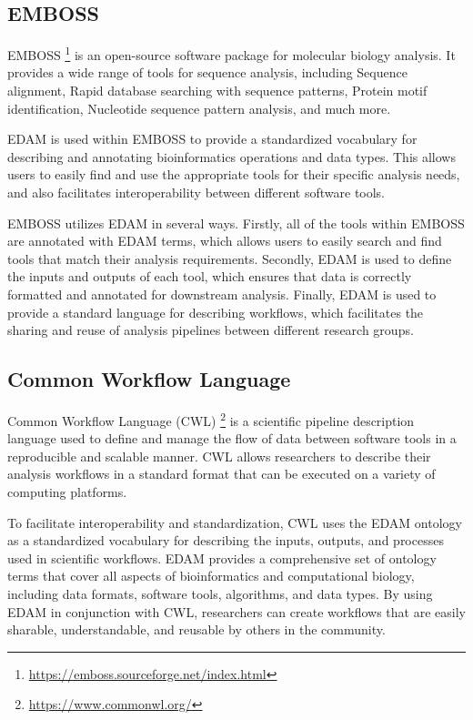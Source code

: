 \documentclass{scrartcl}
\begin{document}
\subsection{EMBOSS}
EMBOSS \footnote{\url{https://emboss.sourceforge.net/index.html}} is an open-source software package 
  for molecular biology analysis. It provides a wide range of tools for sequence analysis, 
  including Sequence alignment, Rapid database searching with sequence patterns, 
  Protein motif identification, Nucleotide sequence pattern analysis, and much more.

EDAM is used within EMBOSS to provide a standardized vocabulary for describing and annotating 
  bioinformatics operations and data types. 
  This allows users to easily find and use the appropriate tools for their specific analysis needs, 
  and also facilitates interoperability between different software tools.

EMBOSS utilizes EDAM in several ways. Firstly, all of the tools within EMBOSS are annotated with EDAM terms, 
  which allows users to easily search and find tools that match their analysis requirements. 
  Secondly, EDAM is used to define the inputs and outputs of each tool, which ensures that data is correctly 
  formatted and annotated for downstream analysis. Finally, EDAM is used to provide a standard language for 
  describing workflows, which facilitates the sharing and reuse of analysis pipelines between 
  different research groups.


  

\subsection{Common Workflow Language}

Common Workflow Language (CWL) \cite{cwl} \footnote{\url{https://www.commonwl.org/}} is a scientific pipeline description language used to define and manage the 
  flow of data between software tools in a reproducible and scalable manner. CWL allows researchers to 
  describe their analysis workflows in a standard format that can be executed on a variety of computing 
  platforms.

To facilitate interoperability and standardization, CWL uses the EDAM ontology as a standardized 
  vocabulary for describing the inputs, outputs, and processes used in scientific workflows. 
  EDAM provides a comprehensive set of ontology terms that cover all aspects of bioinformatics and 
  computational biology, including data formats, software tools, algorithms, and data types. 
  By using EDAM in conjunction with CWL, researchers can create workflows that are easily sharable, 
  understandable, and reusable by others in the community.


\newpage
{}
\printbibliography %
\end{document}
